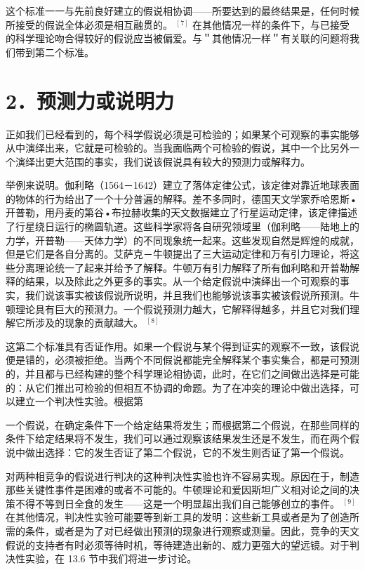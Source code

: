 这个标准一一与先前良好建立的假说相协调——所要达到的最终结果是，任何时候所接受的假说全体必须是相互融贯的。 ${ }^{[7]}$ 在其他情况一样的条件下，与已接受的科学理论吻合得较好的假说应当被偏爱。与＂其他情况一样＂有关联的问题将我们带到第二个标准。

\section*{2．预测力或说明力}
正如我们已经看到的，每个科学假说必须是可检验的；如果某个可观察的事实能够从中演绎出来，它就是可检验的。当我面临两个可检验的假说，其中一个比另外一个演绎出更大范围的事实，我们说该假说具有较大的预测力或解释力。

举例来说明。伽利略（1564－1642）建立了落体定律公式，该定律对靠近地球表面的物体的行为给出了一个十分普遍的解释。差不多同时，德国天文学家乔哈恩斯•开普勒，用丹麦的第谷•布拉赫收集的天文数据建立了行星运动定律，该定律描述了行星绕日运行的椭圆轨道。这些科学家将各自研究领域里（伽利略——陆地上的力学，开普勒——天体力学）的不同现象统一起来。这些发现自然是辉煌的成就，但是它们是各自分离的。艾萨克－牛顿提出了三大运动定律和万有引力理论，将这些分离理论统一了起来并给予了解释。牛顿万有引力解释了所有伽利略和开普勒解释的结果，以及除此之外更多的事实。从一个给定假说中演绎出一个可观察的事实，我们说该事实被该假说所说明，并且我们也能够说该事实被该假说所预测。牛顿理论具有巨大的预测力。一个假说预测力越大，它解释得越多，并且它对我们理解它所涉及的现象的贡献越大。 ${ }^{[8]}$

这第二个标准具有否证作用。如果一个假说与某个得到证实的观察不一致，该假说便是错的，必须被拒绝。当两个不同假说都能完全解释某个事实集合，都是可预测的，并且都与已经构建的整个科学理论相协调，此时，在它们之间做出选择是可能的：从它们推出可检验的但相互不协调的命题。为了在冲突的理论中做出选择，可以建立一个判决性实验。根据第

一个假说，在确定条件下一个给定结果将发生；而根据第二个假说，在那些同样的条件下给定结果将不发生，我们可以通过观察该结果发生还是不发生，而在两个假说中做出选择：它的发生否证了第二个假说，它的不发生则否证了第一个假说。

对两种相竞争的假说进行判决的这种判决性实验也许不容易实现。原因在于，制造那些关键性事件是困难的或者不可能的。牛顿理论和爱因斯坦广义相对论之间的决策不得不等到日全食的发生——这是一个明显超出我们自己能够创立的事件。 ${ }^{[9]}$ 在其他情况，判决性实验可能要等到新工具的发明：这些新工具或者是为了创造所需的条件，或者是为了对已经做出预测的现象进行观察或测量。因此，竞争的天文假说的支持者有时必须等待时机，等待建造出新的、威力更强大的望远镜。对于判决性实验，在 13.6 节中我们将进一步讨论。

